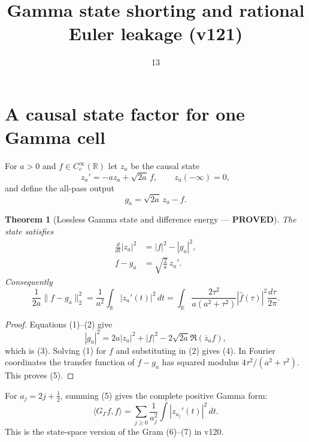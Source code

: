 \documentclass[11pt]{article}
\title{Gamma state shorting and rational Euler leakage (v121)}
\date{13}
\newcommand{\PROVED}{\textcolor{green!40!black}{\textbf{PROVED}}}
\newtheorem{theorem}{Theorem}
\begin{document}
\maketitle

\section{A causal state factor for one Gamma cell}

For $a>0$ and $f\in C_c^\infty(\mathbb R)$ let $z_a$ be the causal state
\begin{equation}
 z_a'=-az_a+\sqrt{2a}\,f,\qquad z_a(-\infty)=0,              \tag{1}
\end{equation}
and define the all-pass output
\begin{equation}
 g_a=\sqrt{2a}\,z_a-f.                                      \tag{2}
\end{equation}

\begin{theorem}[Lossless Gamma state and difference energy --- \PROVED]
The state satisfies
\begin{align}
 \frac d{dt}|z_a|^2&=|f|^2-|g_a|^2,                         \tag{3}\\
 f-g_a&=\sqrt{\frac2a}\,z_a'.                               \tag{4}
\end{align}
Consequently
\begin{equation}
 \boxed{
 \frac1{2a}\|f-g_a\|_2^2
 =\frac1{a^2}\int_{\mathbb R}|z_a'(t)|^2\,dt
 =\int_{\mathbb R}
   \frac{2\tau^2}{a(a^2+\tau^2)}
   |\widehat f(\tau)|^2\frac{d\tau}{2\pi}.}                 \tag{5}
\end{equation}
\end{theorem}

\begin{proof}
Equations (1)--(2) give
\[
 |g_a|^2=2a|z_a|^2+|f|^2-2\sqrt{2a}\Re(\overline z_af),
\]
which is (3).  Solving (1) for $f$ and substituting in (2) gives (4).
In Fourier coordinates the transfer function of $f-g_a$ has squared
modulus $4\tau^2/(a^2+\tau^2)$.  This proves (5).
\end{proof}

For $a_j=2j+\frac12$, summing (5) gives the complete positive Gamma form:
\begin{equation}
 \langle G_\Gamma f,f\rangle
 =\sum_{j\ge0}\frac1{a_j^2}\int|z_{a_j}'(t)|^2\,dt.          \tag{6}
\end{equation}
This is the state-space version of the Gram (6)--(7) in v120.
\end{document}
